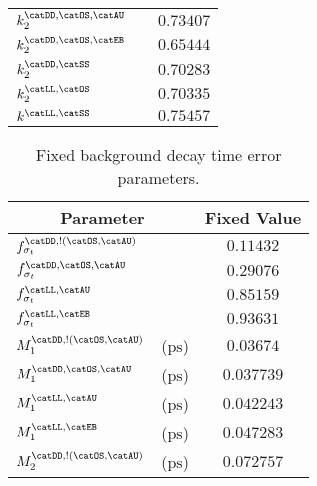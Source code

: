 \begin{table}[htb]
\begin{tabular}{llr@{$\,\pm\,$}l}
  $k_2^\text{\catDD,\catOS,\catAU}$          &                       & \multicolumn{2}{c}{$0.73407$}\\
  $k_2^\text{\catDD,\catOS,\catEB}$          &                       & \multicolumn{2}{c}{$0.65444$}\\
  $k_2^\text{\catDD,\catSS}$                 &                       & \multicolumn{2}{c}{$0.70283$}\\
  $k_2^\text{\catLL,\catOS}$                 &                       & \multicolumn{2}{c}{$0.70335$}\\
  $k^\text{\catLL,\catSS}$                   &                       & \multicolumn{2}{c}{$0.75457$}\\
  \bottomrule
\end{tabular}
\end{table}
%
\begin{table}[htb]
\caption{Fixed background decay time error parameters.}
\label{tab:app:measurement_of_sin2beta:cpv_measurement:fixed_parameters:decay_time_error:bkg}
\centering
\begin{tabular}{llr@{$\,\pm\,$}l}
  \toprule
  \multicolumn{2}{c}{Parameter}                  & \multicolumn{2}{c}{Fixed Value} \\
  \midrule
  $f_{\sigma_t}^\text{\catDD,!(\catOS,\catAU)}$  &                       & \multicolumn{2}{c}{$0.11432$}\\
  $f_{\sigma_t}^\text{\catDD,\catOS,\catAU}$     &                       & \multicolumn{2}{c}{$0.29076$}\\
  $f_{\sigma_t}^\text{\catLL,\catAU}$            &                       & \multicolumn{2}{c}{$0.85159$}\\
  $f_{\sigma_t}^\text{\catLL,\catEB}$            &                       & \multicolumn{2}{c}{$0.93631$}\\
  $M_1^\text{\catDD,!(\catOS,\catAU)}$           & ($\si{\pico\second}$) & \multicolumn{2}{c}{$0.03674$}\\
  $M_1^\text{\catDD,\catOS,\catAU}$              & ($\si{\pico\second}$) & \multicolumn{2}{c}{$0.037739$}\\
  $M_1^\text{\catLL,\catAU}$                     & ($\si{\pico\second}$) & \multicolumn{2}{c}{$0.042243$}\\
  $M_1^\text{\catLL,\catEB}$                     & ($\si{\pico\second}$) & \multicolumn{2}{c}{$0.047283$}\\
  $M_2^\text{\catDD,!(\catOS,\catAU)}$           & ($\si{\pico\second}$) & \multicolumn{2}{c}{$0.072757$}\\

\end{tabular}
\end{table}
